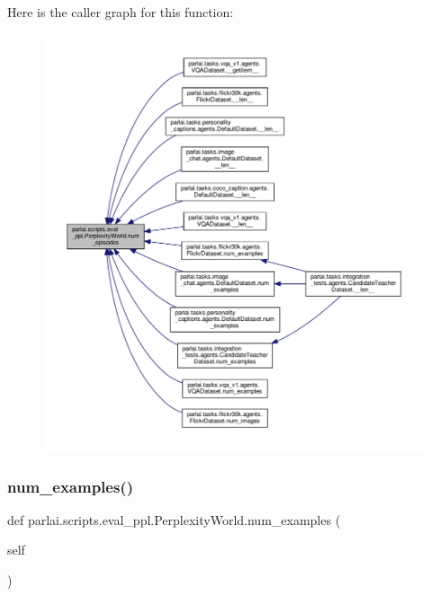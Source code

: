 Here is the caller graph for this function\+:
\nopagebreak
\begin{figure}[H]
\begin{center}
\leavevmode
\includegraphics[width=350pt]{classparlai_1_1scripts_1_1eval__ppl_1_1PerplexityWorld_aed2ab6313608418defd2b167c1893e96_icgraph}
\end{center}
\end{figure}
\mbox{\label{classparlai_1_1scripts_1_1eval__ppl_1_1PerplexityWorld_a13673a4d9cb9a57fbc219336bea1f510}} 
\subsubsection{\texorpdfstring{num\+\_\+examples()}{num\_examples()}}
{\footnotesize\ttfamily def parlai.\+scripts.\+eval\+\_\+ppl.\+Perplexity\+World.\+num\+\_\+examples (\begin{DoxyParamCaption}\item[{}]{self }\end{DoxyParamCaption})}



